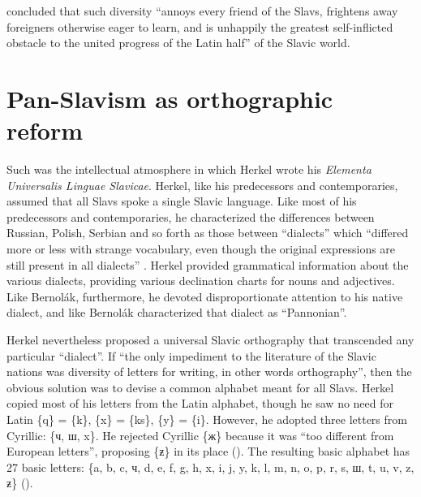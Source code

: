 \noindent \citet[66]{safarik_geschichte_1826} concluded that such diversity “annoys every friend of the Slavs, frightens away foreigners otherwise eager to learn, and is unhappily the greatest self-inflicted obstacle to the united progress of the Latin half” of the Slavic world.

\section{Pan-Slavism as orthographic reform}

Such was the intellectual atmosphere in which Herkel wrote his \textit{Elementa Universalis Linguae Slavicae}. Herkel, like his predecessors and contemporaries, assumed that all Slavs spoke a single Slavic language. Like most of his predecessors and contemporaries, he characterized the differences between Russian, Polish, Serbian and so forth as those between “dialects” which “differed more or less with strange vocabulary, even though the original expressions are still present in all dialects” \citep[17]{herkel_elementa_1826}. Herkel provided grammatical information about the various dialects, providing various declination charts for nouns and adjectives. Like Bernolák, furthermore, he devoted disproportionate attention to his native dialect, and like Bernolák characterized that dialect as “Pannonian”.

Herkel nevertheless proposed a universal Slavic orthography that transcended any particular “dialect”. If “the only impediment to the literature of the Slavic nations was diversity of letters for writing, in other words orthography”, then the obvious solution was to devise a common alphabet meant for all Slavs. Herkel copied most of his letters from the Latin alphabet, though he saw no need for Latin \{q\} = \{k\}, \{x\} = \{ks\}, \{y\} = \{i\}. However, he adopted three letters from Cyrillic: \{ч, ш, x\}. He rejected Cyrillic \{ж\} because it was “too different from European letters”, proposing \{ƶ\} in its place (\citeyear[8]{herkel_elementa_1826}). The resulting basic alphabet has 27 basic letters: \{a, b, c, ч, d, e, f, g, h, x, i, j, y, k, l, m, n, o, p, r, s, ш, t, u, v, z, ƶ\} (\citeyear[11]{herkel_elementa_1826}).

